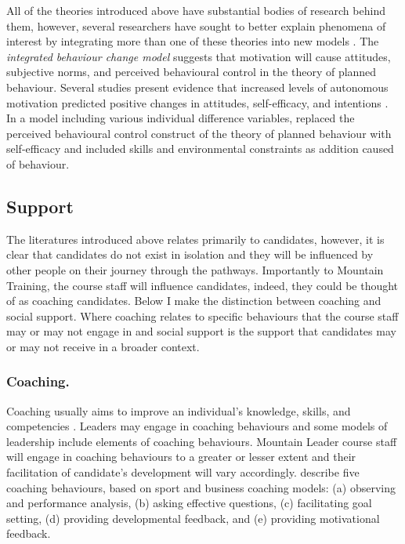 \documentclass[
  12pt,
  a4paper,
]{book}
\begin{document}
All of the theories introduced above have substantial bodies of research behind them, however, several researchers have sought to better explain phenomena of interest by integrating more than one of these theories into new models \citep[e.g.,][]{Fishbein2000, Hagger2009, Hagger2014, Hamilton2017}. The \emph{integrated behaviour change model} \citep{Hagger2009, Hagger2014, Hamilton2017} suggests that motivation will cause attitudes, subjective norms, and perceived behavioural control in the theory of planned behaviour. Several studies present evidence that increased levels of autonomous motivation predicted positive changes in attitudes, self-efficacy, and intentions \citep[e.g.,][]{Hagger2009, Jacobs2011}. In a model including various individual difference variables, \citet{Fishbein2000} replaced the perceived behavioural control construct of the theory of planned behaviour with self-efficacy \citep[n.b.,][ suggested that perceived behavioural control is similar to the construct of self-efficacy]{Ajzen1991} and included skills and environmental constraints as addition caused of behaviour.

\hypertarget{support}{%
\subsection{Support}\label{support}}

The literatures introduced above relates primarily to candidates, however, it is clear that candidates do not exist in isolation and they will be influenced by other people on their journey through the pathways. Importantly to Mountain Training, the course staff will influence candidates, indeed, they could be thought of as coaching candidates. Below I make the distinction between coaching and social support. Where coaching relates to specific behaviours that the course staff may or may not engage in and social support is the support that candidates may or may not receive in a broader context.

\hypertarget{coaching.}{%
\subsubsection{Coaching.}\label{coaching.}}

Coaching usually aims to improve an individual's knowledge, skills, and competencies \citep{Wagstaff2018}. Leaders may engage in coaching behaviours and some models of leadership \citep[e.g., transformational leadership theory;][]{Bass1985} include elements of coaching behaviours. Mountain Leader course staff will engage in coaching behaviours to a greater or lesser extent and their facilitation of candidate's development will vary accordingly. \citet{Wagstaff2018} describe five coaching behaviours, based on sport and business coaching models: (a) observing and performance analysis, (b) asking effective questions, (c) facilitating goal setting, (d) providing developmental feedback, and (e) providing motivational feedback.
\end{document}
